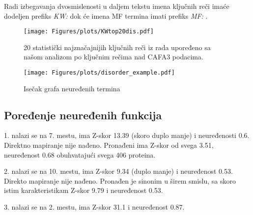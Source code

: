 Radi izbegavanja dvosmislenosti u daljem tekstu imena ključnih reči imaće
dodeljen prefiks \textit{KW: } dok će imena MF termina imati prefiks
\textit{MF: }.

\clearpage

\begin{figure}[th]
\hspace*{-2.5cm} 
\texttt{[image: Figures/plots/KWtop20dis.pdf]}
\decoRule
\caption {
  20 statistički najznačajnijih  ključnih reči iz rada
  \parencite{Xie2007} upoređeno sa našom analizom po ključnim rečima nad CAFA3 podacima.
}
\label{fig:KWtop20dis}
\end{figure}

\begin{figure}[th]
\hspace*{-2.5cm} 
\texttt{[image: Figures/plots/disorder\_example.pdf]}
\decoRule
\caption {
  Isečak grafa neuređenih termina
}
\label{fig:disorder_example}
\end{figure}



\subsection{Poređenje neuređenih funkcija}



1.  nalazi se na 7. mestu, ima  Z-skor 13.39 (skoro duplo manje) i neuređenosti 0.6.
Direktno mapiranje nije nađeno. Pronađeni 
ima Z-skor od svega 3.51, neuređenost 0.68 obuhvatajući svega 406 proteina.

2.  nalazi se na 10. mestu, ima Z-skor 9.34 (duplo manje) i neuređenost 0.53.
Direkto mapiranje nije nađeno. Pronađen je sinonim u širem smislu,
 sa skoro istim karakteristikam Z-skor 9.79 i neuređenost 0.53.

3.  nalazi se na 2. mestu, ima Z-skor 31.1 i neuređenost 0.87.

